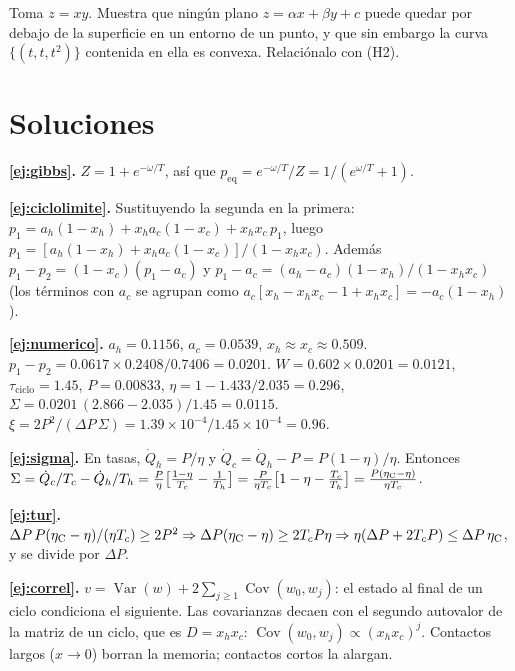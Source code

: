  Toma $z = xy$. Muestra que ningún plano $z = \alpha x + \beta y + c$
puede quedar por debajo de la superficie en un entorno de un punto, y que sin embargo la curva
$\{(t,t,t^2)\}$ contenida en ella es convexa. Relaciónalo con (H2).

\section{Soluciones}

\textbf{\ref{ej:gibbs}.} $Z = 1 + e^{-\omega/T}$, así que
$p_{\mathrm{eq}} = e^{-\omega/T}/Z = 1/(e^{\omega/T} + 1)$.

\textbf{\ref{ej:ciclolimite}.} Sustituyendo la segunda en la primera:
$p_1 = a_h(1-x_h) + x_h a_c(1-x_c) + x_hx_c\,p_1$, luego
$p_1 = [a_h(1-x_h) + x_ha_c(1-x_c)]/(1 - x_hx_c)$. Además $p_1 - p_2 = (1-x_c)(p_1 - a_c)$ y
$p_1 - a_c = (a_h - a_c)(1-x_h)/(1-x_hx_c)$ (los términos con $a_c$ se agrupan como
$a_c[x_h - x_hx_c - 1 + x_hx_c] = -a_c(1-x_h)$).

\textbf{\ref{ej:numerico}.} $a_h = 0.1156$, $a_c = 0.0539$, $x_h \approx x_c \approx 0.509$.
$p_1 - p_2 = 0.0617\times0.2408/0.7406 = 0.0201$. $W = 0.602\times0.0201 = 0.0121$,
$\tau_{\mathrm{ciclo}} = 1.45$, $P = 0.00833$, $\eta = 1 - 1.433/2.035 = 0.296$,
$\Sigma = 0.0201\,(2.866 - 2.035)/1.45 = 0.0115$.
$\xi = 2P^2/(\Delta P\,\Sigma) = 1.39\times10^{-4}/1.45\times10^{-4} = 0.96$.

\textbf{\ref{ej:sigma}.} En tasas, $\dot Q_h = P/\eta$ y $\dot Q_c = \dot Q_h - P = P(1-\eta)/\eta$.
Entonces $\Sigma = \dot Q_c/T_c - \dot Q_h/T_h = \frac{P}{\eta}\bigl[\frac{1-\eta}{T_c} - \frac{1}{T_h}\bigr]
= \frac{P}{\eta T_c}\bigl[1 - \eta - \frac{T_c}{T_h}\bigr] = \frac{P(\eta_{\mathrm{C}}-\eta)}{\eta T_c}$.

\textbf{\ref{ej:tur}.} $\Delta P\,P(\eta_{\mathrm{C}}-\eta)/(\eta T_c) \ge 2P^2 \Rightarrow \Delta P(\eta_{\mathrm{C}}-\eta)\ge
2T_cP\eta \Rightarrow \eta(\Delta P + 2T_cP) \le \Delta P\,\eta_{\mathrm{C}}$, y se divide por $\Delta P$.

\textbf{\ref{ej:correl}.} $v = \operatorname{Var}(w) + 2\sum_{j\ge1}\operatorname{Cov}(w_0,w_j)$: el
estado al final de un ciclo condiciona el siguiente. Las covarianzas decaen con el segundo autovalor
de la matriz de un ciclo, que es $D = x_hx_c$: $\operatorname{Cov}(w_0,w_j)\propto (x_hx_c)^{j}$.
Contactos largos ($x\to0$) borran la memoria; contactos cortos la alargan.

